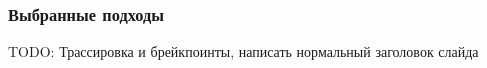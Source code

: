 \begin{frame}
\frametitle{Выбранные подходы}
TODO: Трассировка и брейкпоинты, написать нормальный заголовок слайда
\end{frame}
